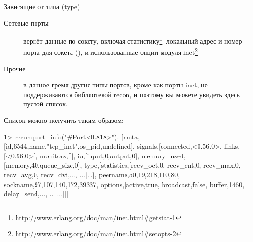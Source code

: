 \documentclass[11pt, oneside]{book}   	%
\begin{document}
\begin{description*}
\item[Зависящие от типа (type)] \hfill
\begin{description}		
	\item[Сетевые порты] вернёт данные по сокету, включая статистику\footnote{\href{http://www.erlang.org/doc/man/inet.html\#getstat-1}{http://www.erlang.org/doc/man/inet.html\#getstat-1}}, локальный адрес и номер порта для сокета (), и использованные опции модуля inet\footnote{\href{http://www.erlang.org/doc/man/inet.html\#setopts-2}{http://www.erlang.org/doc/man/inet.html\#setopts-2}}

	\item[Прочие] в данное время другие типы портов, кроме как порты inet, не поддерживаются библиотекой recon, и поэтому вы можете увидеть здесь пустой список.
\end{description}
\end{description*}
		
Список можно получить таким образом:

\begin{VerbatimEshell}
1> recon:port_info("#Port<0.818>").
[{meta,[{id,6544},{name,"tcp_inet"},{os_pid,undefined}]},
 {signals,[{connected,<0.56.0>},
           {links,[<0.56.0>]},
           {monitors,[]}]},
 {io,[{input,0},{output,0}]},
 {memory_used,[{memory,40},{queue_size,0}]},
 {type,[{statistics,[{recv_oct,0},
                     {recv_cnt,0},
                     {recv_max,0},
                     {recv_avg,0},
                     {recv_dvi,...},
                     {...}|...]},
        {peername,{{50,19,218,110},80}},
        {sockname,{{97,107,140,172},39337}},
        {options,[{active,true},
                  {broadcast,false},
                  {buffer,1460},
                  {delay_send,...},
                  {...}|...]}]}]
\end{VerbatimEshell}
		
\end{document}
